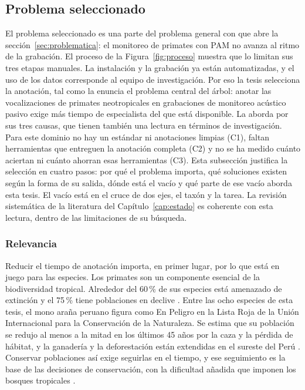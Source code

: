 \subsection{Problema seleccionado}
\label{sec:seleccionado}
\label{sec:brecha}

El problema seleccionado es una parte del problema general con que abre la
sección~\ref{sec:problematica}: el monitoreo de primates con PAM no avanza al
ritmo de la grabación. El proceso de la Figura~\ref{fig:proceso} muestra que lo
limitan sus tres etapas manuales. La instalación y la grabación ya están
automatizadas, y el uso de los datos corresponde al equipo de investigación. Por
eso la tesis selecciona la anotación, tal como la enuncia el problema central del
árbol: anotar las vocalizaciones de primates neotropicales en grabaciones de
monitoreo acústico pasivo exige más tiempo de especialista del que está
disponible. La aborda por sus tres causas, que tienen también una lectura en
términos de investigación. Para este dominio no hay un estándar ni anotaciones
limpias (C1), faltan herramientas que entreguen la anotación completa (C2) y no
se ha medido cuánto aciertan ni cuánto ahorran esas herramientas (C3). Esta
subsección justifica la selección en cuatro pasos: por qué el problema importa,
qué soluciones existen según la forma de su salida, dónde está el vacío y qué
parte de ese vacío aborda esta tesis. El vacío está en el cruce de dos ejes, el
taxón y la tarea. La revisión sistemática de la literatura del
Capítulo~\ref{cap:estado} es coherente con esta lectura, dentro de las
limitaciones de su búsqueda.

\subsubsection{Relevancia}
\label{sec:relevancia}

Reducir el tiempo de anotación importa, en primer lugar, por lo que está en juego
para las especies. Los primates son un componente esencial de la biodiversidad
tropical. Alrededor del 60\,\% de sus especies está amenazado de extinción y el
75\,\% tiene poblaciones en declive \citep{estrada_impending_2017}. Entre las ocho
especies de esta tesis, el mono araña peruano figura como En Peligro en la Lista
Roja de la Unión Internacional para la Conservación de la Naturaleza. Se estima
que su población se redujo al menos a la mitad en los últimos 45 años por la caza
y la pérdida de hábitat, y la ganadería y la deforestación están extendidas en el
sureste del Perú \citep{alves_ateles_2021}. Conservar poblaciones así exige
seguirlas en el tiempo, y ese seguimiento es la base de las decisiones de
conservación, con la dificultad añadida que imponen los bosques tropicales
\citep{zwerts_methods_2021}.

